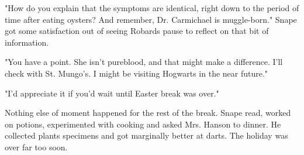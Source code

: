 "How do you explain that the symptoms are identical, right down to the period of time after eating oysters? And remember, Dr. Carmichael is muggle-born." Snape got some satisfaction out of seeing Robards pause to reflect on that bit of information.

"You have a point. She isn't pureblood, and that might make a difference. I'll check with St. Mungo's. I might be visiting Hogwarts in the near future."

"I'd appreciate it if you'd wait until Easter break was over."

Nothing else of moment happened for the rest of the break. Snape read, worked on potions, experimented with cooking and asked Mrs. Hanson to dinner. He collected plants specimens and got marginally better at darts. The holiday was over far too soon. 


